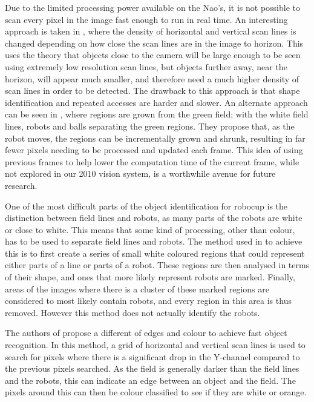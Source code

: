 \documentclass[runningheads,a4paper]{llncs}
\begin{document}
Due to the limited processing power available on the Nao's, it is not possible to scan every pixel in the image fast enough to run in real time. An interesting approach is taken in \cite{north2005object}, where the density of horizontal and vertical scan lines is changed depending on how close the scan lines are in the image to horizon. This uses the theory that objects close to the camera will be large enough to be seen using extremely low resolution scan lines, but objects further away, near the horizon, will appear much smaller, and therefore need a much higher density of scan lines in order to be detected. The drawback to this approach is that shape identification and repeated accesses are harder and slower. An alternate approach can be seen in \cite{von2004tracking}, where regions are grown from the green field; with the white field lines, robots and balls separating the green regions. They propose that, as the robot moves, the regions can be incrementally grown and shrunk, resulting in far fewer pixels needing to be processed and updated each frame. This idea of using previous frames to help lower the computation time of the current frame, while not explored in our 2010 vision system, is a worthwhile avenue for future research.

One of the most difficult parts of the object identification for robocup is the distinction between field lines and robots, as many parts of the robots are white or close to white. This means that some kind of processing, other than colour, has to be used to separate field lines and robots. The method used in \cite{thomas09code} to achieve this is to first create a series of small white coloured regions that could represent either parts of a line or parts of a robot. These regions are then analysed in terms of their shape, and ones that more likely represent robots are marked. Finally, areas of the images where there is a cluster of these marked regions are considered to most likely contain robots, and every region in this area is thus removed. However this method does not actually identify the robots.

The authors of \cite{rofer2004fast} propose a different of edges and colour to achieve fast object recognition. In this method, a grid of horizontal and vertical scan lines is used to search for pixels where there is a significant drop in the Y-channel compared to the previous pixels searched. As the field is generally darker than the field lines and the robots, this can indicate an edge between an object and the field. The pixels around this can then be colour classified to see if they are white or orange.
\end{document}
